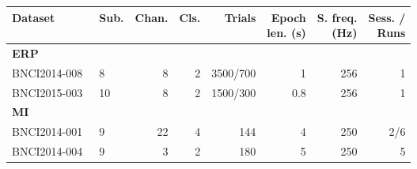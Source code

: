 \sffamily
\small
\begin{tabularx}{\textwidth}{@{}lXrrrrrr@{}}
  \toprule
  Dataset  & Sub. & Chan. & Cls. & Trials &
  \makecell{Epoch \\ len. (s)} & \makecell{S. freq. \\ (Hz)} & \makecell{Sess. / \\ Runs} \\
  \midrule
  \textbf{ERP} &&&&&&& \\
  BNCI2014-008~\cite{Riccio2013}   & 8  & 8  & 2  & 3500/700 & 1   & 256 & 1 \\
  BNCI2015-003~\cite{Guger2009}    & 10 & 8  & 2  & 1500/300 & 0.8 & 256 & 1 \\
  \midrule
  \textbf{MI} &&&&&&& \\
  BNCI2014-001~\cite{Tangermann2012}   & 9  & 22 & 4  & 144     & 4   & 250 & 2/6 \\
  BNCI2014-004~\cite{Leeb2007}         & 9  & 3  & 2  & 180     & 5   & 250 & 5 \\
  \bottomrule
\end{tabularx}
